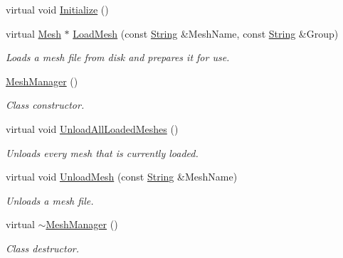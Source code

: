 \begin{DoxyCompactItemize}
\item 
virtual void \hyperlink{classphys_1_1MeshManager_a95103f27f689a644c3501383e03ee731}{Initialize} ()
\item 
virtual \hyperlink{classphys_1_1Mesh}{Mesh} $\ast$ \hyperlink{classphys_1_1MeshManager_aa35e2953c88b103c6fb3c39c2813f7ef}{LoadMesh} (const \hyperlink{namespacephys_aa03900411993de7fbfec4789bc1d392e}{String} \&MeshName, const \hyperlink{namespacephys_aa03900411993de7fbfec4789bc1d392e}{String} \&Group)
\begin{DoxyCompactList}\small\item\em Loads a mesh file from disk and prepares it for use. \item\end{DoxyCompactList}\item 
\hypertarget{classphys_1_1MeshManager_ae576564292a49d2298e420585ea2436a}{
\hyperlink{classphys_1_1MeshManager_ae576564292a49d2298e420585ea2436a}{MeshManager} ()}
\label{classphys_1_1MeshManager_ae576564292a49d2298e420585ea2436a}

\begin{DoxyCompactList}\small\item\em Class constructor. \item\end{DoxyCompactList}\item 
\hypertarget{classphys_1_1MeshManager_adf4f9c6ec5a6121d96fd62d782bd99ad}{
virtual void \hyperlink{classphys_1_1MeshManager_adf4f9c6ec5a6121d96fd62d782bd99ad}{UnloadAllLoadedMeshes} ()}
\label{classphys_1_1MeshManager_adf4f9c6ec5a6121d96fd62d782bd99ad}

\begin{DoxyCompactList}\small\item\em Unloads every mesh that is currently loaded. \item\end{DoxyCompactList}\item 
virtual void \hyperlink{classphys_1_1MeshManager_a3e9177d980445a7e8038d401c5914af3}{UnloadMesh} (const \hyperlink{namespacephys_aa03900411993de7fbfec4789bc1d392e}{String} \&MeshName)
\begin{DoxyCompactList}\small\item\em Unloads a mesh file. \item\end{DoxyCompactList}\item 
\hypertarget{classphys_1_1MeshManager_a546e8686c6f0a38dcde66fb8c0dbf050}{
virtual \hyperlink{classphys_1_1MeshManager_a546e8686c6f0a38dcde66fb8c0dbf050}{$\sim$MeshManager} ()}
\label{classphys_1_1MeshManager_a546e8686c6f0a38dcde66fb8c0dbf050}

\begin{DoxyCompactList}\small\item\em Class destructor. \item\end{DoxyCompactList}\end{DoxyCompactItemize}
